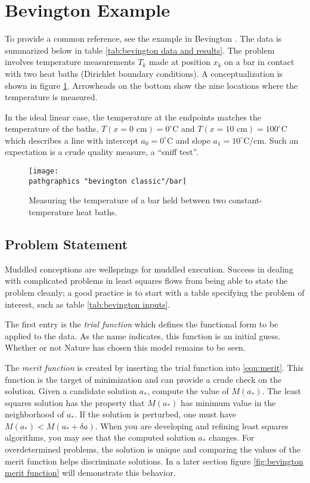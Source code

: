 \section{Bevington Example}  %

To provide a common reference, see the example in Bevington \cite[ch 6]{Bevington}. The data is summarized below in table \ref{tab:bevington data and results}. The problem involves temperature measurements $T_{k}$ made at position $x_{k}$ on a bar in contact with two heat baths (Dirichlet boundary conditions). A conceptualization is shown in figure \ref{fig:bar}. Arrowheads on the bottom show the nine locations where the temperature is measured.

In the ideal linear case, the temperature at the endpoints matches the temperature of the baths, $T(x=0 \text{ cm}) = 0^{\circ}$C and $T(x = 10 \text{ cm}) = 100^{\circ}$C which describes a line with intercept $a_{0} = 0^{\circ}$C and slope $a_{1} = 10^{\circ}$C/cm. Such an expectation is a crude quality measure, a ``sniff test''.

\begin{figure}[htbp] %
   \centering
   \texttt{[image: \\pathgraphics "bevington classic"/bar]} 
   \caption[Measuring the temperature of a bar.]{Measuring the temperature of a bar held between two constant-temperature heat baths.}
   \label{fig:bar}
\end{figure}

\subsection{Problem Statement}  %
Muddled conceptions are wellsprings for muddled execution. Success in dealing with complicated problems in least squares flows from being able to state the problem cleanly; a good practice is to start with a table specifying the problem of interest, such as table \ref{tab:bevington inputs}.

The first entry is the \emph{trial function} which defines the functional form to be applied to the data. As the name indicates, this function is an initial guess. Whether or not Nature has chosen this model remains to be seen.

The \emph{merit function} is created by inserting the trial function into \eqref{eqn:merit}. This function is the target of minimization and can provide a crude check on the solution. Given a candidate solution $a_{*}$, compute the value of $M(a_{*})$. The least squares solution has the property that $M(a_{*})$ has minimum value in the neighborhood of $a_{*}$. If the solution is perturbed, one must have $M(a_{*}) < M(a_{*} + \delta a)$. When you are developing and refining least squares algorithms, you may see that the computed solution $a_{*}$ changes. For overdetermined problems, the solution is unique and comparing the values of the merit function helps discriminate solutions. In a later section figure \ref{fig:bevington merit function} will demonstrate this behavior.

